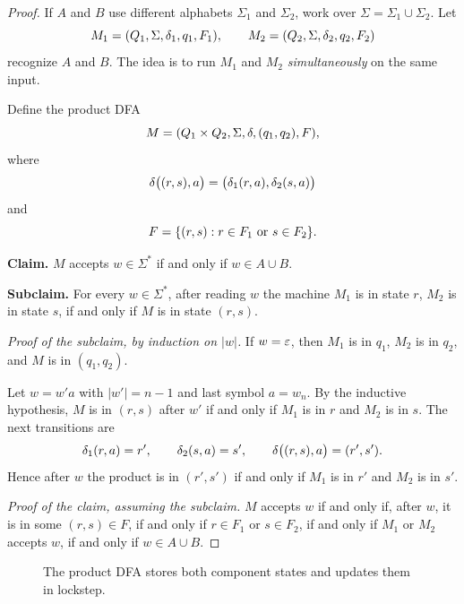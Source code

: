 \begin{proof}
If $A$ and $B$ use different alphabets $\Sigma_1$ and $\Sigma_2$, work over
$\Sigma=\Sigma_1\cup\Sigma_2$. Let
\[
  M_1=(Q_1,\Sigma,\delta_1,q_1,F_1),\qquad
  M_2=(Q_2,\Sigma,\delta_2,q_2,F_2)
\]
recognize $A$ and $B$. The idea is to run $M_1$ and $M_2$
\emph{simultaneously} on the same input.

Define the product DFA
\[
  M=(Q_1\times Q_2,\Sigma,\delta,(q_1,q_2),F),
\]
where
\[
  \delta\bigl((r,s),a\bigr)
    =\bigl(\delta_1(r,a),\delta_2(s,a)\bigr)
\]
and
\[
  F=\{(r,s):r\in F_1\text{ or }s\in F_2\}.
\]

\textbf{Claim.} $M$ accepts $w\in\Sigma^*$ if and only if $w\in A\cup B$.

\textbf{Subclaim.} For every $w\in\Sigma^*$, after reading $w$ the machine
$M_1$ is in state $r$, $M_2$ is in state $s$, if and only if $M$ is in state
$(r,s)$.

\textit{Proof of the subclaim, by induction on $|w|$.}
If $w=\varepsilon$, then $M_1$ is in $q_1$, $M_2$ is in $q_2$, and $M$ is in
$(q_1,q_2)$.

Let $w=w'a$ with $|w'|=n-1$ and last symbol $a=w_n$. By the inductive
hypothesis, $M$ is in $(r,s)$ after $w'$ if and only if $M_1$ is in $r$ and
$M_2$ is in $s$. The next transitions are
\[
  \delta_1(r,a)=r',\qquad
  \delta_2(s,a)=s',\qquad
  \delta\bigl((r,s),a\bigr)=(r',s').
\]
Hence after $w$ the product is in $(r',s')$ if and only if $M_1$ is in $r'$
and $M_2$ is in $s'$.

\textit{Proof of the claim, assuming the subclaim.}
$M$ accepts $w$ if and only if, after $w$, it is in some $(r,s)\in F$, if and
only if $r\in F_1$ or $s\in F_2$, if and only if $M_1$ or $M_2$ accepts $w$,
if and only if $w\in A\cup B$.
\end{proof}

\begin{figure}[ht]
\centering
{}
\caption{The product DFA stores both component states and updates them in lockstep.}
\end{figure}

